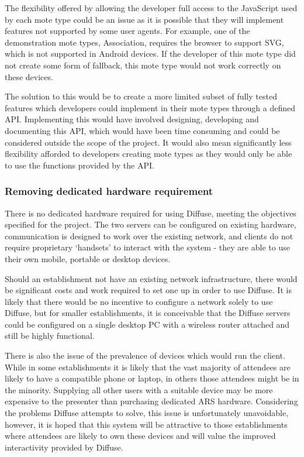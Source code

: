 \documentclass[a4papert,11pt,notitlepage]{article}
\begin{document}
The flexibility offered by allowing the developer full access to the JavaScript used by each mote type could be an issue as it is possible that they will implement features not supported by some user agents. For example, one of the demonstration mote types, Association, requires the browser to support SVG, which is not supported in Android devices. If the developer of this mote type did not create some form of fallback, this mote type would not work correctly on these devices. 

The solution to this would be to create a more limited subset of fully tested features which developers could implement in their mote types through a defined API. Implementing this would have involved designing, developing and documenting this API, which would have been time consuming and could be considered outside the scope of the project. It would also mean significantly less flexibility afforded to developers creating mote types as they would only be able to use the functions provided by the API.

\subsubsection{Removing dedicated hardware requirement}
There is no dedicated hardware required for using Diffuse, meeting the objectives specified for the project. The two servers can be configured on existing hardware, communication is designed to work over the existing network, and clients do not require proprietary `handsets' to interact with the system - they are able to use their own mobile, portable or desktop devices.

Should an establishment not have an existing network infrastructure, there would be significant costs and work required to set one up in order to use Diffuse. It is likely that there would be no incentive to configure a network solely to use Diffuse, but for smaller establishments, it is conceivable that the Diffuse servers could be configured on a single desktop PC with a wireless router attached and still be highly functional.

There is also the issue of the prevalence of devices which would run the client. While in some establishments it is likely that the vast majority of attendees are likely to have a compatible phone or laptop, in others those attendees might be in the minority. Supplying all other users with a suitable device may be more expensive to the presenter than purchasing dedicated ARS hardware. Considering the problems Diffuse attempts to solve, this issue is unfortunately unavoidable, however, it is hoped that this system will be attractive to those establishments where attendees are likely to own these devices and will value the improved interactivity provided by Diffuse.
\end{document}
